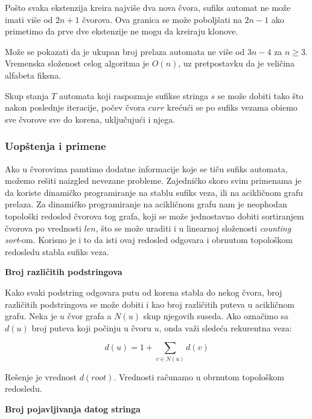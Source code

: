 Po\v sto svaka ekstenzija kreira najvi\v se dva nova \v cvora, sufiks automat ne mo\v ze imati vi\v se od $2n+1$ \v cvorova. Ova granica se mo\v ze pobolj\v sati na $2n-1$ ako primetimo da prve dve ekstenzije ne mogu da kreiraju klonove.

Mo\v ze se pokazati da je ukupan broj prelaza automata ne vi\v se od $3n-4$ za $n \geq 3$. Vremenska slo\v zenost celog algoritma je $O(n)$, uz pretpostavku da je veli\v cina alfabeta fiksna. \cite{suffixautomatonrad}

Skup stanja $T$ automata koji raspoznaje sufikse stringa $s$ se mo\v ze dobiti tako \v sto nakon poslednje iteracije, po\v cev \v cvora $curr$ kre\' cu\' ci se po sufiks vezama obi\dj emo sve \v cvorove sve do korena, uklju\v cuju\' ci i njega.

\subsubsection{Uop\v stenja i primene}

Ako u \v cvorovima pamtimo dodatne informacije koje se ti\v cu sufiks automata, mo\v zemo re\v siti naizgled nevezane probleme. Zajedni\v cko skoro svim primenama je da koriste dinami\v cko programiranje na stablu sufiks veza, ili na acikli\v cnom grafu prelaza. Za dinami\v cko programiranje na acikli\v cnom grafu nam je neophodan topolo\v ski redosled \v cvorova tog grafa, koji se mo\v ze jednostavno dobiti sortiranjem \v cvorova po vrednosti $len$, \v sto se mo\v ze uraditi i u linearnoj slo\v zenosti \textit{counting sort}-om. Korisno je i to da isti ovaj redosled odgovara i obrnutom topolo\v skom redosledu stabla sufiks veza.

\noindent
\textbf{Broj razli\v citih podstringova}

Kako svaki podstring odgovara putu od korena stabla do nekog \v cvora, broj razli\v citih podstringova se mo\v ze dobiti i kao broj razli\v citih puteva u acikli\v cnom grafu. Neka je $u$ \v cvor grafa a $N(u)$ skup njegovih suseda. Ako ozna\v cimo sa $d(u)$ broj puteva koji po\v cinju u \v cvoru $u$, onda va\v zi slede\' ca rekurentna veza:

\begin{equation}
    d(u) = 1 + \sum_{v \in N(u)} d(v)
\end{equation}

Re\v senje je vrednost $d(root)$. Vrednosti ra\v cunamo u obrnutom topolo\v skom redosledu.

\noindent
\textbf{Broj pojavljivanja datog stringa}

